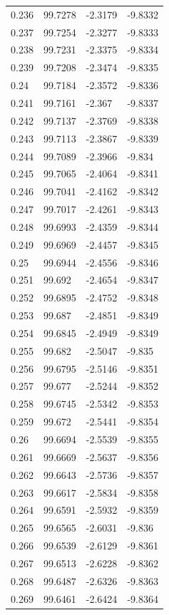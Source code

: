 \begin{tabular}{llll}
0.236 & 99.7278 & -2.3179 & -9.8332 \\
0.237 & 99.7254 & -2.3277 & -9.8333 \\
0.238 & 99.7231 & -2.3375 & -9.8334 \\
0.239 & 99.7208 & -2.3474 & -9.8335 \\
0.24 & 99.7184 & -2.3572 & -9.8336 \\
0.241 & 99.7161 & -2.367 & -9.8337 \\
0.242 & 99.7137 & -2.3769 & -9.8338 \\
0.243 & 99.7113 & -2.3867 & -9.8339 \\
0.244 & 99.7089 & -2.3966 & -9.834 \\
0.245 & 99.7065 & -2.4064 & -9.8341 \\
0.246 & 99.7041 & -2.4162 & -9.8342 \\
0.247 & 99.7017 & -2.4261 & -9.8343 \\
0.248 & 99.6993 & -2.4359 & -9.8344 \\
0.249 & 99.6969 & -2.4457 & -9.8345 \\
0.25 & 99.6944 & -2.4556 & -9.8346 \\
0.251 & 99.692 & -2.4654 & -9.8347 \\
0.252 & 99.6895 & -2.4752 & -9.8348 \\
0.253 & 99.687 & -2.4851 & -9.8349 \\
0.254 & 99.6845 & -2.4949 & -9.8349 \\
0.255 & 99.682 & -2.5047 & -9.835 \\
0.256 & 99.6795 & -2.5146 & -9.8351 \\
0.257 & 99.677 & -2.5244 & -9.8352 \\
0.258 & 99.6745 & -2.5342 & -9.8353 \\
0.259 & 99.672 & -2.5441 & -9.8354 \\
0.26 & 99.6694 & -2.5539 & -9.8355 \\
0.261 & 99.6669 & -2.5637 & -9.8356 \\
0.262 & 99.6643 & -2.5736 & -9.8357 \\
0.263 & 99.6617 & -2.5834 & -9.8358 \\
0.264 & 99.6591 & -2.5932 & -9.8359 \\
0.265 & 99.6565 & -2.6031 & -9.836 \\
0.266 & 99.6539 & -2.6129 & -9.8361 \\
0.267 & 99.6513 & -2.6228 & -9.8362 \\
0.268 & 99.6487 & -2.6326 & -9.8363 \\
0.269 & 99.6461 & -2.6424 & -9.8364 \\

\end{tabular}
